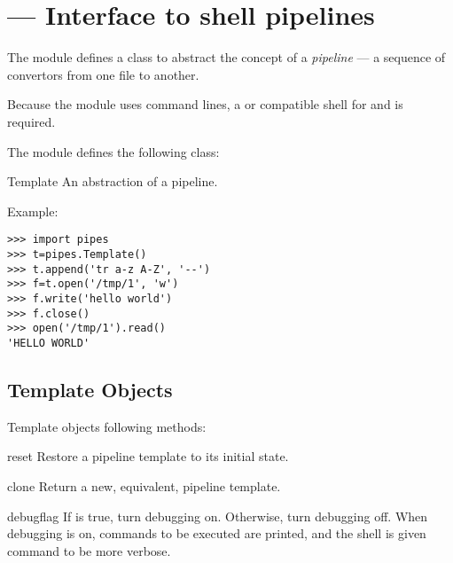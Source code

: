 \section{ ---
         Interface to shell pipelines}



The  module defines a class to abstract the concept of
a \emph{pipeline} --- a sequence of convertors from one file to 
another.

Because the module uses  command lines, a \POSIX{} or
compatible shell for  and 
is required.

The  module defines the following class:

\begin{classdesc}{Template}{}
An abstraction of a pipeline.
\end{classdesc}

Example:

\begin{verbatim}
>>> import pipes
>>> t=pipes.Template()
>>> t.append('tr a-z A-Z', '--')
>>> f=t.open('/tmp/1', 'w')
>>> f.write('hello world')
>>> f.close()
>>> open('/tmp/1').read()
'HELLO WORLD'
\end{verbatim}


\subsection{Template Objects \label{template-objects}}

Template objects following methods:

\begin{methoddesc}{reset}{}
Restore a pipeline template to its initial state.
\end{methoddesc}

\begin{methoddesc}{clone}{}
Return a new, equivalent, pipeline template.
\end{methoddesc}

\begin{methoddesc}{debug}{flag}
If  is true, turn debugging on. Otherwise, turn debugging
off. When debugging is on, commands to be executed are printed, and
the shell is given  command to be more verbose.
\end{methoddesc}

